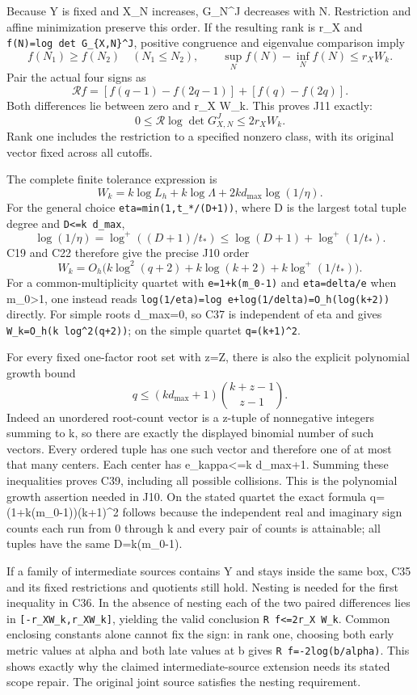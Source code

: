 \documentclass[11pt]{article}
\begin{document}
Because Y is fixed and X\_N increases, G\_N\^{}J decreases with N. Restriction and affine minimization preserve this order. If the resulting rank is r\_X and \texttt{f(N)=log\ det\ G\_\{X,N\}\^{}J}, positive congruence and eigenvalue comparison imply \[
f(N_1)\ge f(N_2)\quad(N_1\le N_2),\qquad
\sup_Nf(N)-\inf_Nf(N)\le r_XW_k.
\] Pair the actual four signs as \[
\mathcal Rf=[f(q-1)-f(2q-1)]+[f(q)-f(2q)].
\] Both differences lie between zero and r\_X W\_k. This proves J11 exactly: \[
0\le\mathcal R\log\det G_{X,N}^J\le2r_XW_k.
\tag{C36}
\] Rank one includes the restriction to a specified nonzero class, with its original vector fixed across all cutoffs.

The complete finite tolerance expression is \[
W_k=k\log L_h+k\log\Lambda+2kd_{\max}\log(1/\eta).
\tag{C37}
\] For the general choice \texttt{eta=min(1,t\_*/(D+1))}, where D is the largest total tuple degree and \texttt{D\textless{}=k\ d\_max}, \[
\log(1/\eta)=\log^+((D+1)/t_*)
 \le\log(D+1)+\log^+(1/t_*).
\] C19 and C22 therefore give the precise J10 order \[
W_k=O_h\bigl(k\log^2(q+2)+k\log(k+2)
 +k\log^+(1/t_*)\bigr).
\tag{C38}
\] For a common-multiplicity quartet with \texttt{e=1+k(m\_0-1)} and \texttt{eta=delta/e} when m\_0\textgreater1, one instead reads \texttt{log(1/eta)=log\ e+log(1/delta)=O\_h(log(k+2))} directly. For simple roots d\_max=0, so C37 is independent of eta and gives \texttt{W\_k=O\_h(k\ log\^{}2(q+2))}; on the simple quartet \texttt{q=(k+1)\^{}2}.

For every fixed one-factor root set with z=\textbar Z\textbar, there is also the explicit polynomial growth bound \[
q\le(kd_{\max}+1)\binom{k+z-1}{z-1}.
\tag{C39}
\] Indeed an unordered root-count vector is a z-tuple of nonnegative integers summing to k, so there are exactly the displayed binomial number of such vectors. Every ordered tuple has one such vector and therefore one of at most that many centers. Each center has e\_kappa\textless=k d\_max+1. Summing these inequalities proves C39, including all possible collisions. This is the polynomial growth assertion needed in J10. On the stated quartet the exact formula q=(1+k(m\_0-1))(k+1)\^{}2 follows because the independent real and imaginary sign counts each run from 0 through k and every pair of counts is attainable; all tuples have the same D=k(m\_0-1).

If a family of intermediate sources contains Y and stays inside the same box, C35 and its fixed restrictions and quotients still hold. Nesting is needed for the first inequality in C36. In the absence of nesting each of the two paired differences lies in \texttt{{[}-r\_XW\_k,r\_XW\_k{]}}, yielding the valid conclusion \texttt{\textbar{}R\ f\textbar{}\textless{}=2r\_X\ W\_k}. Common enclosing constants alone cannot fix the sign: in rank one, choosing both early metric values at alpha and both late values at b gives \texttt{R\ f=-2log(b/alpha)}. This shows exactly why the claimed intermediate-source extension needs its stated scope repair. The original joint source satisfies the nesting requirement.
\end{document}
